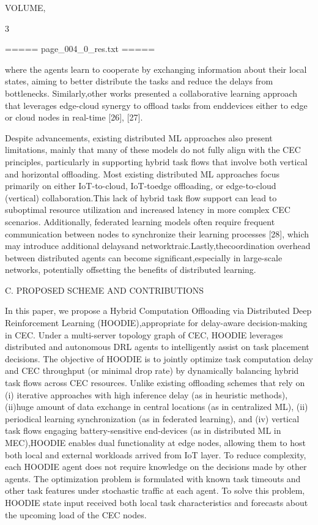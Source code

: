 \documentclass{article}
\begin{document}
VOLUME,

3

===== page\_004\_0\_res.txt =====


where the agents learn to cooperate by exchanging information about their local states, aiming to better distribute the tasks and reduce the delays from bottlenecks. Similarly,other works presented a collaborative learning approach that leverages edge-cloud synergy to offload tasks from enddevices either to edge or cloud nodes in real-time [26], [27].

Despite advancements, existing distributed ML approaches also present limitations, mainly that many of these models do not fully align with the CEC principles, particularly in supporting hybrid task flows that involve both vertical and horizontal offloading. Most existing distributed ML approaches focus primarily on either IoT-to-cloud, IoT-toedge offloading, or edge-to-cloud (vertical) collaboration.This lack of hybrid task flow support can lead to suboptimal resource utilization and increased latency in more complex CEC scenarios. Additionally, federated learning models often require frequent communication between nodes to synchronize their learning processes [28], which may introduce additional delaysand networktraic.Lastly,thecoordination overhead between distributed agents can become significant,especially in large-scale networks, potentially offsetting the benefits of distributed learning.

C. PROPOSED SCHEME AND CONTRIBUTIONS

In this paper, we propose a Hybrid Computation Offloading via Distributed Deep Reinforcement Learning (HOODIE),appropriate for delay-aware decision-making in CEC. Under a multi-server topology graph of CEC, HOODIE leverages distributed and autonomous DRL agents to intelligently assist on task placement decisions. The objective of HOODIE is to jointly optimize task computation delay and CEC throughput (or minimal drop rate) by dynamically balancing hybrid task flows across CEC resources. Unlike existing offloading schemes that rely on (i) iterative approaches with high inference delay (as in heuristic methods), (ii)huge amount of data exchange in central locations (as in centralized ML), (ii) periodical learning synchronization (as in federated learning), and (iv) vertical task flows engaging battery-sensitive end-devices (as in distributed ML in MEC),HOODIE enables dual functionality at edge nodes, allowing them to host both local and external workloads arrived from IoT layer. To reduce complexity, each HOODIE agent does not require knowledge on the decisions made by other agents. The optimization problem is formulated with known task timeouts and other task features under stochastic traffic at each agent. To solve this problem, HOODIE state input received both local task characteristics and forecasts about the upcoming load of the CEC nodes.
\end{document}
